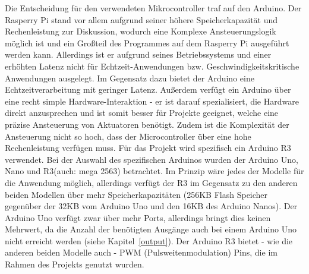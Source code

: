 Die Entscheidung für den verwendeten Mikrocontroller traf auf den Arduino. Der Rasperry Pi stand vor allem aufgrund
seiner höhere Speicherkapazität und Rechenleistung zur Diskussion, wodurch eine Komplexe Ansteuerungslogik
möglich ist und ein Großteil des Programmes auf dem Rasperry Pi ausgeführt werden kann. Allerdings ist er aufgrund
seines Betriebssystems und einer erhöhten Latenz nicht für Echtzeit-Anwendungen bzw. Geschwindigkeitskritische
Anwendungen ausgelegt. Im Gegensatz dazu bietet der Arduino eine Echtzeitverarbeitung mit geringer Latenz.
Außerdem verfügt ein Arduino über eine recht simple Hardware-Interaktion - er ist darauf spezialisiert, die
Hardware direkt anzusprechen und ist somit besser für Projekte geeignet, welche eine präzise Ansteuerung von
Aktuatoren benötigt. Zudem ist die Komplexität der Ansteuerung nicht so hoch, dass der Microcontroller über eine
hohe Rechenleistung verfügen muss. \newline
Für das Projekt wird spezifisch ein Arduino R3 verwendet. Bei der Auswahl des spezifischen Arduinos wurden der Arduino
Uno, Nano und R3(auch: mega 2563) betrachtet. Im Prinzip wäre jedes der Modelle für die Anwendung möglich, allerdings
verfügt der R3 im Gegensatz zu den anderen beiden Modellen über mehr Speicherkapazitäten (256KB Flash Speicher
gegenüber der 32KB vom Arduino Uno und den 16KB des Arduino Nanos). Der Arduino Uno verfügt zwar über mehr Ports,
allerdings bringt dies keinen Mehrwert, da die Anzahl der benötigten Ausgänge auch bei einem Arduino Uno nicht erreicht werden
(siehe Kapitel~\ref{output}).
Der Arduino R3 bietet - wie die anderen beiden Modelle auch - PWM (Pulsweitenmodulation) Pins, die im Rahmen des Projekts
genutzt wurden.

